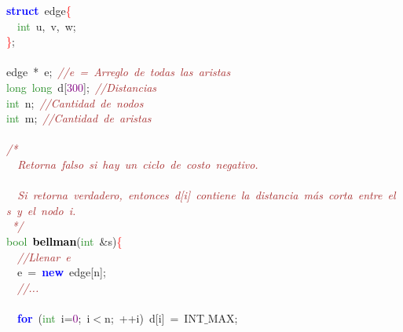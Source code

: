 
{\ttfamily \raggedright {
\noindent
\mbox{}\textbf{\textcolor{Blue}{struct}}\ edge\textcolor{Red}{\{} \\
\mbox{}\ \ \textcolor{ForestGreen}{int}\ u\textcolor{BrickRed}{,}\ v\textcolor{BrickRed}{,}\ w\textcolor{BrickRed}{;} \\
\mbox{}\textcolor{Red}{\}}\textcolor{BrickRed}{;} \\
\mbox{} \\
\mbox{}edge\ \textcolor{BrickRed}{*}\ e\textcolor{BrickRed}{;}\ \textit{\textcolor{Brown}{//e\ =\ Arreglo\ de\ todas\ las\ aristas}} \\
\mbox{}\textcolor{ForestGreen}{long}\ \textcolor{ForestGreen}{long}\ d\textcolor{BrickRed}{[}\textcolor{Purple}{300}\textcolor{BrickRed}{];}\ \textit{\textcolor{Brown}{//Distancias}} \\
\mbox{}\textcolor{ForestGreen}{int}\ n\textcolor{BrickRed}{;}\ \textit{\textcolor{Brown}{//Cantidad\ de\ nodos}} \\
\mbox{}\textcolor{ForestGreen}{int}\ m\textcolor{BrickRed}{;}\ \textit{\textcolor{Brown}{//Cantidad\ de\ aristas}} \\
\mbox{} \\
\mbox{}\textit{\textcolor{Brown}{/*}} \\
\mbox{}\textit{\textcolor{Brown}{\ \ Retorna\ falso\ si\ hay\ un\ ciclo\ de\ costo\ negativo.}} \\
\mbox{} \\
\mbox{}\textit{\textcolor{Brown}{\ \ Si\ retorna\ verdadero,\ entonces\ d[i]\ contiene\ la\ distancia\ más\ corta\ entre\ el\ s\ y\ el\ nodo\ i.}} \\
\mbox{}\textit{\textcolor{Brown}{\ */}} \\
\mbox{}\textcolor{ForestGreen}{bool}\ \textbf{\textcolor{Black}{bellman}}\textcolor{BrickRed}{(}\textcolor{ForestGreen}{int}\ \textcolor{BrickRed}{\&}s\textcolor{BrickRed}{)}\textcolor{Red}{\{} \\
\mbox{}\ \ \textit{\textcolor{Brown}{//Llenar\ e}} \\
\mbox{}\ \ e\ \textcolor{BrickRed}{=}\ \textbf{\textcolor{Blue}{new}}\ edge\textcolor{BrickRed}{[}n\textcolor{BrickRed}{];} \\
\mbox{}\ \ \textit{\textcolor{Brown}{//...}} \\
\mbox{} \\
\mbox{}\ \ \textbf{\textcolor{Blue}{for}}\ \textcolor{BrickRed}{(}\textcolor{ForestGreen}{int}\ i\textcolor{BrickRed}{=}\textcolor{Purple}{0}\textcolor{BrickRed}{;}\ i\textcolor{BrickRed}{$<$}n\textcolor{BrickRed}{;}\ \textcolor{BrickRed}{++}i\textcolor{BrickRed}{)}\ d\textcolor{BrickRed}{[}i\textcolor{BrickRed}{]}\ \textcolor{BrickRed}{=}\ INT$\_$MAX\textcolor{BrickRed}{;} \\
}}
